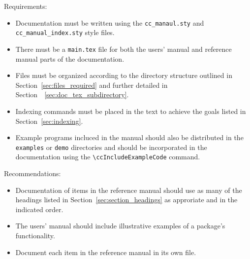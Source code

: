 \noindent
Requirements:
\begin{itemize}
   \item Documentation must be written using the {\tt cc\_manaul.sty}
         and {\tt cc\_manual\_index.sty} style files.
   \item There must be a {\tt main.tex} file for both the users' manual
         and reference manual parts of the documentation.
   \item Files must be organized according to the directory structure
         outlined in Section~\ref{sec:files_required} and further detailed
         in Section~~\ref{sec:doc_tex_subdirectory}.
   \item Indexing commands must be placed in the text to achieve the
         goals listed in Section~\ref{sec:indexing}.
   \item Example programs incluced in the manual should also be distributed
         in the \texttt{examples} or \texttt{demo} directories and should
         be incorporated in the documentation  using the 
         \verb|\ccIncludeExampleCode| command.
\end{itemize}

\noindent
Recommendations:
\begin{itemize}
   \item Documentation of items in the reference manual should use as
         many of the headings listed in Section~\ref{sec:section_headings}
         as approriate and in the indicated order.
   \item The users' manual should include illustrative examples of a package's
         functionality.
   \item Document each item in the reference manual in its own file.
\end{itemize}

